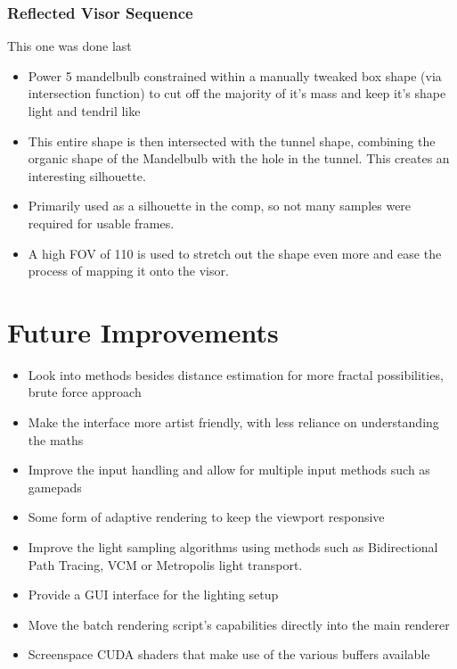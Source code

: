 \documentclass[11pt,a4paper,final,notitlepage]{report}
\begin{document}
\subsection{Reflected Visor Sequence}
This one was done last

\begin{itemize}
\item Power 5 mandelbulb constrained within a manually tweaked box shape (via intersection function)
to cut off the majority of it’s mass and keep it’s shape light and tendril like
\item This entire shape is then intersected with the tunnel shape, combining the organic shape of
the Mandelbulb with the hole in the tunnel. This creates an interesting silhouette.
\item Primarily used as a silhouette in the comp, so not many samples were required for usable
frames.
\item A high FOV of 110 is used to stretch out the shape even more and ease the process of mapping
it onto the visor.
\end{itemize}

\chapter{Future Improvements}

\begin{itemize}
	\item Look into methods besides distance estimation for more fractal possibilities, brute force approach
	\item Make the interface more artist friendly, with less reliance on understanding the maths
	\item Improve the input handling and allow for multiple input methods such as gamepads
	\item Some form of adaptive rendering to keep the viewport responsive
	\item Improve the light sampling algorithms using methods such as Bidirectional Path Tracing, VCM or Metropolis light transport.
	\item Provide a GUI interface for the lighting setup
	\item Move the batch rendering script's capabilities directly into the main renderer
	\item Screenspace CUDA shaders that make use of the various buffers available	
\end{itemize}
\end{document}
